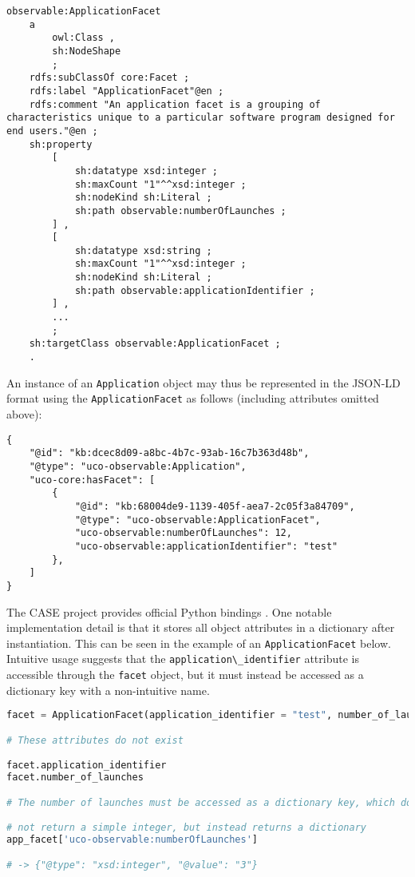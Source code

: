 \documentclass[letterpaper,12pt]{report}
\newcommand{\passthrough}[1]{#1}
\begin{document}
\begin{lstlisting}
observable:ApplicationFacet
    a
        owl:Class ,
        sh:NodeShape
        ;
    rdfs:subClassOf core:Facet ;
    rdfs:label "ApplicationFacet"@en ;
    rdfs:comment "An application facet is a grouping of characteristics unique to a particular software program designed for end users."@en ;
    sh:property
        [
            sh:datatype xsd:integer ;
            sh:maxCount "1"^^xsd:integer ;
            sh:nodeKind sh:Literal ;
            sh:path observable:numberOfLaunches ;
        ] ,
        [
            sh:datatype xsd:string ;
            sh:maxCount "1"^^xsd:integer ;
            sh:nodeKind sh:Literal ;
            sh:path observable:applicationIdentifier ;
        ] ,
        ...
        ;
    sh:targetClass observable:ApplicationFacet ;
    .
\end{lstlisting}

An instance of an \passthrough{\lstinline!Application!} object may thus
be represented in the JSON-LD format using the
\passthrough{\lstinline!ApplicationFacet!} as follows (including
attributes omitted above):

\begin{lstlisting}
{
    "@id": "kb:dcec8d09-a8bc-4b7c-93ab-16c7b363d48b",
    "@type": "uco-observable:Application",
    "uco-core:hasFacet": [
        {
            "@id": "kb:68004de9-1139-405f-aea7-2c05f3a84709",
            "@type": "uco-observable:ApplicationFacet",
            "uco-observable:numberOfLaunches": 12,
            "uco-observable:applicationIdentifier": "test"
        },
    ]
}
\end{lstlisting}

The CASE project provides official Python bindings
\cite{CaseworkCASEMappingPython}. One notable implementation detail
is that it stores all object attributes in a dictionary after
instantiation. This can be seen in the example of an
\passthrough{\lstinline!ApplicationFacet!} below. Intuitive usage
suggests that the \passthrough{\lstinline!application\_identifier!}
attribute is accessible through the \passthrough{\lstinline!facet!}
object, but it must instead be accessed as a dictionary key with a
non-intuitive name.

\begin{lstlisting}[language=Python]
facet = ApplicationFacet(application_identifier = "test", number_of_launches=3)

# These attributes do not exist

facet.application_identifier
facet.number_of_launches

# The number of launches must be accessed as a dictionary key, which does

# not return a simple integer, but instead returns a dictionary
app_facet['uco-observable:numberOfLaunches']

# -> {"@type": "xsd:integer", "@value": "3"}
\end{lstlisting}
\end{document}
